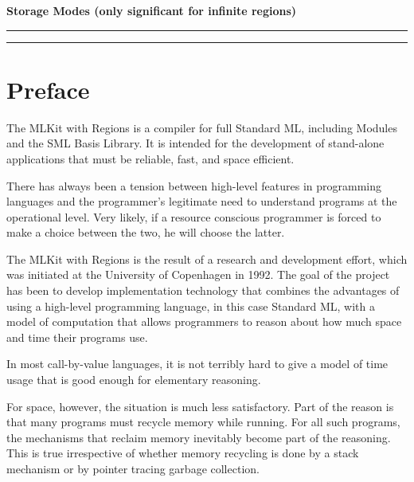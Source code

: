 \documentclass[12pt]{book}
\begin{document}
\begin{center}
\bf Storage Modes (only significant for infinite regions)
\end{center}
\smallskip

\hrule
{}
\hrule
\medskip
               
\tableofcontents
\chapter*{Preface}
The MLKit with Regions is a compiler for full
%
Standard ML, including Modules and the SML Basis Library.  It is
intended for the development of stand-alone applications that must be
reliable, fast, and space efficient.

There has always been a tension between high-level features in
programming languages and the programmer's legitimate need to
understand programs at the operational level. Very likely, if a
resource conscious programmer is forced to make a choice between the
two, he will choose the latter.

The MLKit with Regions is the result of a research and development
effort, which was initiated at the University of Copenhagen in 1992.
The goal of the project has been to develop implementation technology
that combines the advantages of using a high-level programming
language, in this case Standard ML, with a model of computation that
allows programmers to reason about how much space and time their
programs use.

In most call-by-value languages, it is not terribly hard to give a
model of time usage that is good enough for elementary reasoning. 

For space, however, the situation is much less satisfactory. Part of
the reason is that many programs must recycle memory while running.
For all such programs, the mechanisms that reclaim memory inevitably
become part of the reasoning.  This is true irrespective of whether
memory recycling is done by a
% 
stack mechanism or by pointer tracing garbage collection.
\end{document}
